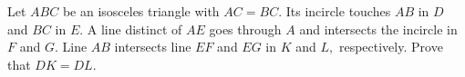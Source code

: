 Let $ ABC$ be an isosceles triangle with $ AC = BC.$ Its incircle touches $ AB$ in $ D$ and $ BC$ in $ E.$ A line distinct of $ AE$ goes through $ A$ and intersects the incircle  in $ F$ and $ G.$ Line $ AB$ intersects line $ EF$ and $ EG$ in $ K$ and $ L,$ respectively. Prove that $ DK = DL.$